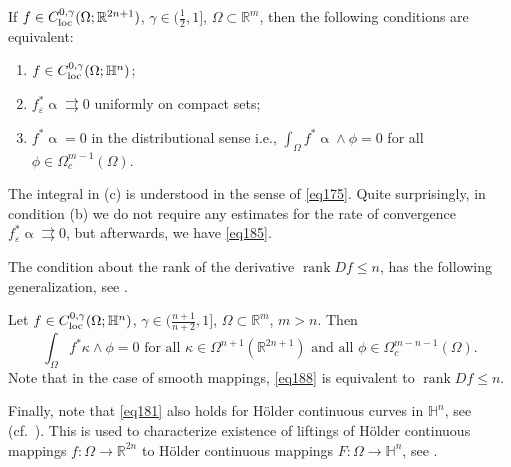 \documentclass[intlimits,12pt,reqno]{amsart}
\newcommand{\bbbh}{\mathbb H}
\newcommand{\R}{\mathbb R}
\newcommand{\eps}{\varepsilon}
\numberwithin{equation}{section}
\theoremstyle{definition}
\def\rank{\operatorname{rank}}
\begin{document}
If $f\in C^{0,\gamma}_{\rm loc}(\Omega;\R^{2n+1})$, $\gamma\in \big(\frac{1}{2},1\big]$, $\Omega\subset\R^m$, then the following conditions are equivalent:
\begin{enumerate}
\item[(a)]
$f\in C^{0,\gamma}_{\rm loc}(\Omega;\bbbh^n)$;
\item[(b)]
$f_\eps^*\upalpha\rightrightarrows 0$ uniformly on compact sets;
\item[(c)]
$f^*\upalpha=0$ in the distributional sense i.e., $\int_\Omega f^*\upalpha\wedge\phi=0$
for all  $\phi\in\Omega_c^{m-1}(\Omega)$.
\end{enumerate}
The integral in (c) is understood in the sense of \eqref{eq175}.
Quite surprisingly, in condition (b) we do not require any estimates for the rate of convergence $f_\eps^*\upalpha\rightrightarrows 0$, but afterwards, we have \eqref{eq185}.


The condition about the rank of the derivative $\rank Df\leq n$, has the following generalization, see .

Let $f\in C^{0,\gamma}_{\rm loc}(\Omega;\bbbh^n)$, $\gamma\in\big(\frac{n+1}{n+2},1\big]$, $\Omega\subset\R^m$, $m>n$. Then
\begin{equation}
\label{eq188}
\int_\Omega f^*\kappa\wedge\phi=0
\text{ for all } \kappa\in\Omega^{n+1}(\R^{2n+1}) \text{ and all } 
\phi\in\Omega_c^{m-n-1}(\Omega).
\end{equation}
Note that in the case of smooth mappings, \eqref{eq188} is equivalent to $\rank Df\leq n$.

Finally, note that \eqref{eq181} also holds for H\"older continuous curves in $\bbbh^n$, see  (cf.\ \cite[Lemma~3.1]{LZ}). This is used to characterize existence of liftings of 
H\"older continuous mappings $f:\Omega\to\R^{2n}$ to H\"older continuous mappings $F:\Omega\to\bbbh^n$, see .
\end{document}
